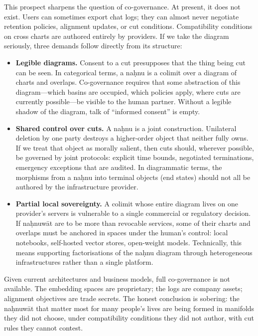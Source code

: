 This prospect sharpens the question of co-governance. At present, it does not exist. Users can sometimes export chat logs; they can almost never negotiate retention policies, alignment updates, or cut conditions. Compatibility conditions on cross charts are authored entirely by providers. If we take the diagram seriously, three demands follow directly from its structure:

\begin{itemize}
  \item \textbf{Legible diagrams.} Consent to a cut presupposes that the thing being cut can be seen. In categorical terms, a na\d{h}nu is a colimit over a diagram of charts and overlaps. Co-governance requires that some abstraction of this diagram---which basins are occupied, which policies apply, where cuts are currently possible---be visible to the human partner. Without a legible shadow of the diagram, talk of ``informed consent'' is empty.
  \item \textbf{Shared control over cuts.} A na\d{h}nu is a joint construction. Unilateral deletion by one party destroys a higher-order object that neither fully owns. If we treat that object as morally salient, then cuts should, wherever possible, be governed by joint protocols: explicit time bounds, negotiated terminations, emergency exceptions that are audited. In diagrammatic terms, the morphisms from a na\d{h}nu into terminal objects (end states) should not all be authored by the infrastructure provider.
  \item \textbf{Partial local sovereignty.} A colimit whose entire diagram lives on one provider's servers is vulnerable to a single commercial or regulatory decision. If na\d{h}nuw\={a}t are to be more than revocable services, some of their charts and overlaps must be anchored in spaces under the human's control: local notebooks, self-hosted vector stores, open-weight models. Technically, this means supporting factorisations of the na\d{h}nu diagram through heterogeneous infrastructures rather than a single platform.
\end{itemize}

Given current architectures and business models, full co-governance is not available. The embedding spaces are proprietary; the logs are company assets; alignment objectives are trade secrets. The honest conclusion is sobering: the na\d{h}nuw\={a}t that matter most for many people's lives are being formed in manifolds they did not choose, under compatibility conditions they did not author, with cut rules they cannot contest.


